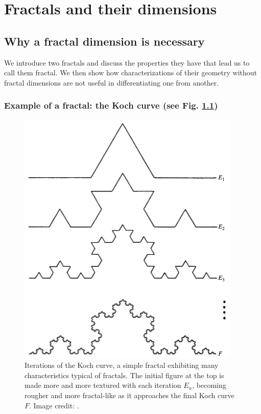 
\chapter{Fractals and their dimensions} %

\label{Chapter1} %




\section{Why a fractal dimension is necessary}
We introduce two fractals and discuss the properties they have that lead us to call them fractal. We then show how characterizations of their geometry without fractal dimensions are not useful in differentiating one from another. 

\subsection{Example of a fractal: the Koch curve (see Fig. \ref{fig:kochcurve})}\label{fractalexample}

\begin{figure}[h]
\centering
\includegraphics[height=0.6\textwidth]{Chapters/Figures/Kochcurve.png} 
\caption[Koch Curve]{Iterations of the Koch curve, a simple fractal exhibiting many characteristics typical of fractals. The initial figure at the top is made more and more textured with each iteration $E_{n}$, becoming rougher and more fractal-like as it approaches the final Koch curve $F$. Image credit: \citep{fractaltextbook}. }\label{fig:kochcurve}
\end{figure}

